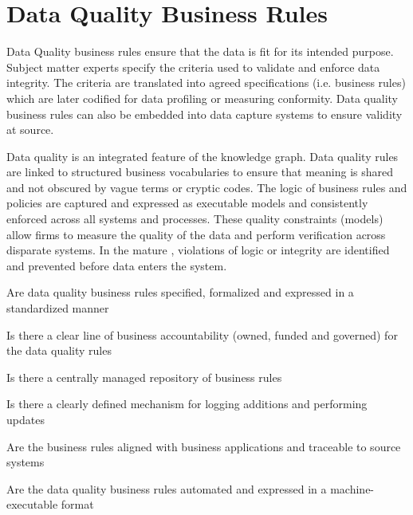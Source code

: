 \section{Data Quality Business Rules}\label{sec:ekgmm-b-3-2} %

Data Quality business rules ensure that the data is fit for its intended purpose.
Subject matter experts specify the criteria used to validate and enforce data integrity.
The criteria are translated into agreed specifications (i.e. business rules) which are later codified for data profiling or measuring conformity.
Data quality business rules can also be embedded into data capture systems to ensure validity at source.

\kgmmekgrationalesection

Data quality is an integrated feature of the knowledge graph.
Data quality rules are linked to structured business vocabularies to ensure that meaning is shared and not obscured by vague terms or cryptic codes.
The logic of business rules and policies are captured and expressed as executable models and consistently enforced across all systems and processes.
These quality constraints (models) allow firms to measure the quality of the data and perform verification across disparate systems.
In the mature , violations of logic or integrity are identified and prevented before data enters the system.

\kgmmcorequestionssection

\begin{core-questions}

  \item [\thesection.1] Are data quality business rules specified, formalized and expressed in a standardized manner
  \item [\thesection.2] Is there a clear line of business accountability (owned, funded and governed) for the data quality rules
  \item [\thesection.3] Is there a centrally managed repository of business rules
  \item [\thesection.4] Is there a clearly defined mechanism for logging additions and performing updates
  \item [\thesection.5] Are the business rules aligned with business applications and traceable to source systems
  \item [\thesection.6] Are the data quality business rules automated and expressed in a machine-executable format

\end{core-questions}

